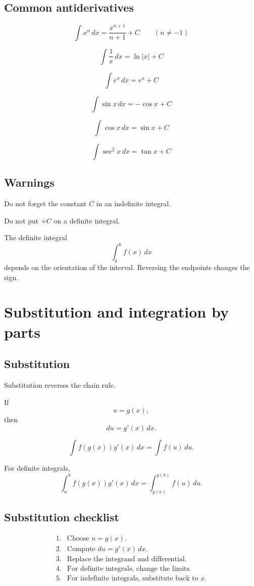 \subsection*{Common antiderivatives}

\[
\int x^n\,dx=\frac{x^{n+1}}{n+1}+C
\qquad (n\ne -1)
\]

\[
\int \frac1x\,dx=\ln|x|+C
\]

\[
\int e^x\,dx=e^x+C
\]

\[
\int \sin x\,dx=-\cos x+C
\]

\[
\int \cos x\,dx=\sin x+C
\]

\[
\int \sec^2x\,dx=\tan x+C
\]

\subsection*{Warnings}

Do not forget the constant \(C\) in an indefinite integral.

Do not put \(+C\) on a definite integral.

The definite integral
\[
    \int_a^b f(x)\,dx
\]
depends on the orientation of the interval.  Reversing the endpoints changes the sign.

\section{Substitution and integration by parts}
\label{app:A.4}

\subsection*{Substitution}

Substitution reverses the chain rule.

If
\[
    u=g(x),
\]
then
\[
\boxed{
    du=g'(x)\,dx.
}
\]

\[
\boxed{
    \int f(g(x))g'(x)\,dx=\int f(u)\,du.
}
\]

For definite integrals,
\[
\boxed{
    \int_a^b f(g(x))g'(x)\,dx
    =
    \int_{g(a)}^{g(b)} f(u)\,du.
}
\]

\subsection*{Substitution checklist}

\[
\begin{array}{ll}
1. & \text{Choose }u=g(x).\\
2. & \text{Compute }du=g'(x)\,dx.\\
3. & \text{Replace the integrand and differential.}\\
4. & \text{For definite integrals, change the limits.}\\
5. & \text{For indefinite integrals, substitute back to }x.
\end{array}
\]

